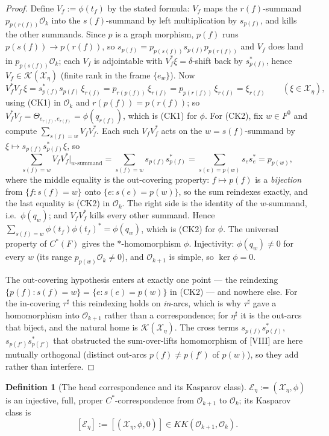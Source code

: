 \documentclass[11pt]{amsart}
\numberwithin{equation}{section}
\theoremstyle{definition}
\newtheorem{definition}[theorem]{Definition}
\theoremstyle{remark}
\newcommand{\cO}{\mathcal{O}}
\newcommand{\cX}{\mathcal{X}}
\newcommand{\cE}{\mathcal{E}}
\newcommand{\cK}{\mathcal{K}}
\newcommand{\KK}{\mathit{KK}}
\begin{document}
\begin{proof}
Define $V_f:=\phi(t_f)$ by the stated formula: $V_f$ maps the $r(f)$-summand
$p_{p(r(f))}\cO_k$ into the $s(f)$-summand by left multiplication by $s_{p(f)}$, and kills
the other summands. Since $p$ is a graph morphism, $p(f)$ runs $p(s(f))\to p(r(f))$, so
$s_{p(f)}=p_{p(s(f))}s_{p(f)}p_{p(r(f))}$ and $V_f$ does land in $p_{p(s(f))}\cO_k$; each
$V_f$ is adjointable with $V_f^{*}\xi=\delta$-shift back by $s_{p(f)}^{*}$, hence
$V_f\in\cK(\cX_\eta)$ (finite rank in the frame $\{e_w\}$). Now
\[
V_f^{*}V_f\,\xi=s_{p(f)}^{*}s_{p(f)}\,\xi_{r(f)}
=p_{r(p(f))}\,\xi_{r(f)}=p_{p(r(f))}\,\xi_{r(f)}=\xi_{r(f)}\qquad(\xi\in\cX_\eta),
\]
using (CK1) in $\cO_k$ and $r(p(f))=p(r(f))$; so $V_f^{*}V_f=\Theta_{e_{r(f)},e_{r(f)}}=\phi(q_{r(f)})$,
which is (CK1) for $\phi$. For (CK2), fix $w\in F^0$ and compute $\sum_{s(f)=w}V_fV_f^{*}$.
Each such $V_fV_f^{*}$ acts on the $w=s(f)$-summand by $\xi\mapsto s_{p(f)}s_{p(f)}^{*}\xi$,
so
\[
\sum_{s(f)=w}V_fV_f^{*}\Big|_{w\text{-summand}}=\sum_{s(f)=w}s_{p(f)}s_{p(f)}^{*}
=\sum_{s(e)=p(w)}s_es_e^{*}=p_{p(w)} ,
\]
where the middle equality is the out-covering property: $f\mapsto p(f)$ is a \emph{bijection}
from $\{f:s(f)=w\}$ onto $\{e:s(e)=p(w)\}$, so the sum reindexes exactly, and the last
equality is (CK2) in $\cO_k$. The right side is the identity of the $w$-summand, i.e.\
$\phi(q_w)$; and $V_fV_f^{*}$ kills every other summand. Hence $\sum_{s(f)=w}\phi(t_f)\phi(t_f)^{*}=\phi(q_w)$,
which is (CK2) for $\phi$. The universal property of $C^*(F)$ gives the $*$-homomorphism
$\phi$. Injectivity: $\phi(q_w)\ne0$ for every $w$ (its range $p_{p(w)}\cO_k\ne0$), and
$\cO_{k+1}$ is simple, so $\ker\phi=0$.

The out-covering hypothesis enters at exactly one point --- the reindexing
$\{p(f):s(f)=w\}=\{e:s(e)=p(w)\}$ in (CK2) --- and nowhere else. For the in-covering
$\tau^{\sharp}$ this reindexing holds on \emph{in}-arcs, which is why $\tau^{\sharp}$ gave a
homomorphism into $\cO_{k+1}$ rather than a correspondence; for $\eta^{\sharp}$ it is the
out-arcs that biject, and the natural home is $\cK(\cX_\eta)$. The cross terms
$s_{p(f)}s_{p(f)}^{*}$, $s_{p(f')}s_{p(f')}^{*}$ that obstructed the sum-over-lifts
homomorphism of [VIII] are here mutually orthogonal (distinct out-arcs $p(f)\ne p(f')$ of
$p(w)$), so they add rather than interfere.
\end{proof}

\begin{definition}[The head correspondence and its Kasparov class]\label{def:class}
$\cE_\eta:=(\cX_\eta,\phi)$ is an injective, full, proper $C^*$-correspondence from
$\cO_{k+1}$ to $\cO_k$; its Kasparov class is
\[
[\cE_\eta]:=[(\cX_\eta,\phi,0)]\in\KK(\cO_{k+1},\cO_k).
\]
\end{definition}
\end{document}
